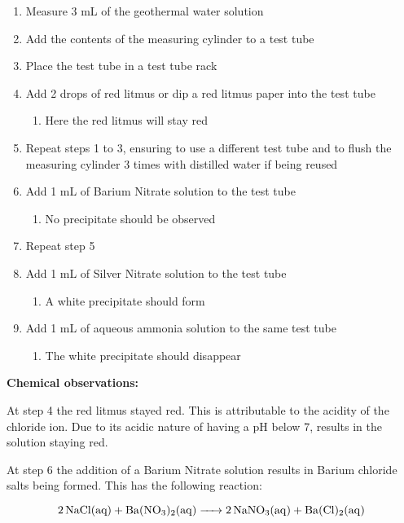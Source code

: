 \documentclass[11pt, a4]{article}
\begin{document}
					\begin{enumerate}
						\item Measure 3 mL of the geothermal water solution
						\item Add the contents of the measuring cylinder to a test tube
						\item Place the test tube in a test tube rack
						\item Add 2 drops of red litmus or dip a red litmus paper into the test tube
							\begin{enumerate}
								\item Here the red litmus will stay red
							\end{enumerate}
						\item Repeat steps 1 to 3, ensuring to use a different test tube and to flush the measuring cylinder 3 times with distilled water if being reused
						\item Add 1 mL of Barium Nitrate solution to the test tube
							\begin{enumerate}
								\item No precipitate should be observed
							\end{enumerate}
						\item Repeat step 5
						\item Add 1 mL of Silver Nitrate solution to the test tube
						\begin{enumerate}
							\item A white precipitate should form
						\end{enumerate}
						\item Add 1 mL of aqueous ammonia solution to the same test tube
							\begin{enumerate}
								\item The white precipitate should disappear
							\end{enumerate}
					\end{enumerate}
				
					\noindent \textbf{Chemical observations:}

					At step 4 the red litmus stayed red. This is attributable to the acidity of the chloride ion. Due to its acidic nature of having a pH below 7, results in the solution staying red.

					At step 6 the addition of a Barium Nitrate solution results in Barium chloride salts being formed. This has the following reaction:

					\begin{equation}
						\ce{2NaCl{(aq)} + Ba(NO_3)_2(aq) -> 2NaNO3(aq) + Ba(Cl)_2(aq)}
					\end{equation}
\end{document}
